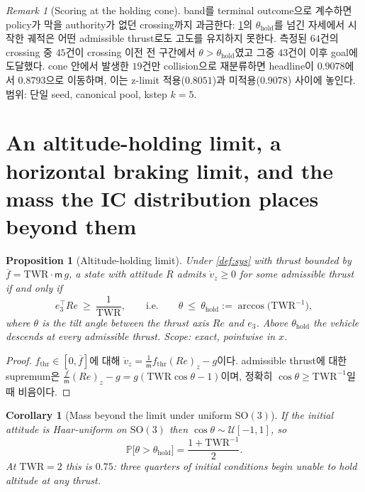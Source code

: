 \documentclass[11pt]{article}
\theoremstyle{plain}
\newtheorem{proposition}[theorem]{Proposition}
\newtheorem{corollary}[theorem]{Corollary}
\theoremstyle{definition}
\theoremstyle{remark}
\newtheorem{remark}[theorem]{Remark}
\newcommand{\Prob}{\mathbb{P}}
\newcommand{\SO}{\mathrm{SO}}
\newcommand{\mass}{\mathsf m}
\newcommand{\eqdef}{:=}
\begin{document}
\begin{remark}[Scoring at the holding cone]\label{rem:tilt-crossing}
band를 terminal outcome으로 계수하면 policy가 막을 authority가 없던 crossing까지 과금한다:
\cref{prop:hold}의 $\theta_{\mathrm{hold}}$를 넘긴 자세에서 시작한 궤적은 어떤 admissible thrust로도
고도를 유지하지 못한다. 측정된 $64$건의 crossing 중 $45$건이 crossing 이전 전 구간에서
$\theta>\theta_{\mathrm{hold}}$였고 그중 $43$건이 이후 goal에 도달했다. cone 안에서 발생한 $19$건만
collision으로 재분류하면 headline이 $0.9078$에서 $0.8793$으로 이동하며, 이는 z-limit
적용($0.8051$)과 미적용($0.9078$) 사이에 놓인다. 범위: 단일 seed, canonical pool, kstep $k=5$.
\end{remark}

\section{An altitude-holding limit, a horizontal braking limit, and the mass the IC distribution places beyond them}\label{sec:hold}

\begin{proposition}[Altitude-holding limit]\label{prop:hold}
Under \cref{def:sys} with thrust bounded by $\overline f=\mathrm{TWR}\cdot\mass\,g$, a state with
attitude $R$ admits $\dot v_z\ge0$ for some admissible thrust if and only if
\begin{equation}
e_3^\top Re\ \ge\ \frac{1}{\mathrm{TWR}},
\qquad\text{i.e.}\qquad
\theta\ \le\ \theta_{\mathrm{hold}}\eqdef\arccos\!\big(\mathrm{TWR}^{-1}\big),
\end{equation}
where $\theta$ is the tilt angle between the thrust axis $Re$ and $e_3$. Above
$\theta_{\mathrm{hold}}$ the vehicle descends at every admissible thrust. Scope: exact,
pointwise in $x$.
\end{proposition}
\begin{proof}
$f_{\mathrm{thr}}\in[0,\overline f]$에 대해
$\dot v_z=\tfrac1{\mass}f_{\mathrm{thr}}(Re)_z-g$이다. admissible thrust에 대한 supremum은
$\tfrac{\overline f}{\mass}(Re)_z-g=g(\mathrm{TWR}\cos\theta-1)$이며, 정확히
$\cos\theta\ge\mathrm{TWR}^{-1}$일 때 비음이다.
\end{proof}

\begin{corollary}[Mass beyond the limit under uniform \texorpdfstring{$\SO(3)$}{SO(3)}]\label{cor:hold-so3}
If the initial attitude is Haar-uniform on $\SO(3)$ then $\cos\theta\sim\mathcal U[-1,1]$, so
\begin{equation}
\Prob\big[\theta>\theta_{\mathrm{hold}}\big]=\frac{1+\mathrm{TWR}^{-1}}{2}.
\end{equation}
At $\mathrm{TWR}=2$ this is $0.75$: three quarters of initial conditions begin unable to hold
altitude at any thrust.
\end{corollary}
\end{document}
